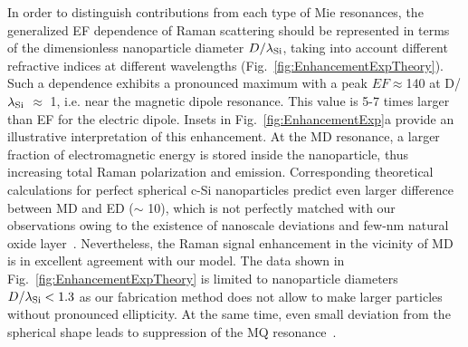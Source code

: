         In order to distinguish contributions from each type of Mie resonances, the generalized EF dependence of Raman
        scattering should be represented in terms of the dimensionless nanoparticle diameter $D/\lambda_{\rm Si}$,
        taking into account different refractive indices at different wavelengths (Fig.~\ref{fig:EnhancementExpTheory}). Such a dependence
        exhibits a pronounced maximum with a peak $EF\approx$140 at D/$\lambda_{\rm Si}$ $\approx$ 1, i.e. near the
        magnetic dipole resonance. This value is 5-7 times larger than EF for the electric dipole. Insets in Fig.~\ref{fig:EnhancementExp}a
        provide an illustrative interpretation of this enhancement. At the MD resonance, a larger fraction of electromagnetic
        energy is stored inside the nanoparticle, thus increasing total Raman polarization and emission.
        Corresponding theoretical calculations for perfect spherical c-Si nanoparticles predict even larger difference between
        MD and ED ($\sim$ 10), which is not perfectly matched with our observations owing to the existence of nanoscale
        deviations and few-nm natural oxide layer~\cite{fu2012directional, zywietz2015electromagnetic}. Nevertheless, the
        Raman signal enhancement in the vicinity of MD is in excellent agreement with our model. The data shown in Fig.~\ref{fig:EnhancementExpTheory}
        is limited to nanoparticle diameters $D/\lambda_{\rm Si}<1.3$ as our fabrication method does not allow to make larger
        particles without pronounced ellipticity. At the same time, even small deviation from the spherical shape leads to
        suppression of the MQ resonance~\cite{fu2012directional}.
